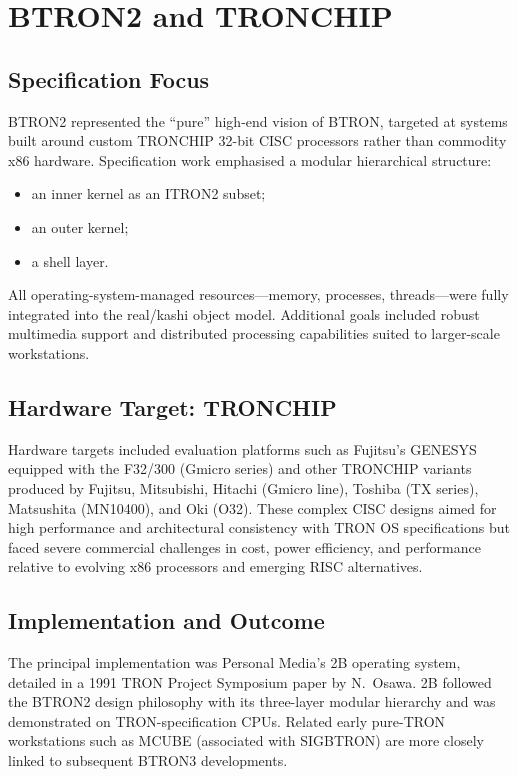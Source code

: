 \documentclass{article}
\begin{document}
\newpage
\section{BTRON2 and TRONCHIP}

\subsection{Specification Focus}

BTRON2 represented the ``pure'' high-end vision of BTRON, targeted at systems built around custom TRONCHIP 32-bit CISC processors rather than commodity x86 hardware. Specification work emphasised a modular hierarchical structure:

\begin{itemize}
  \item an inner kernel as an ITRON2 subset;
  \item an outer kernel;
  \item a shell layer.
\end{itemize}

All operating-system-managed resources---memory, processes, threads---were fully integrated into the real/kashi object model. Additional goals included robust multimedia support and distributed processing capabilities suited to larger-scale workstations.

\subsection{Hardware Target: TRONCHIP}

Hardware targets included evaluation platforms such as Fujitsu's GENESYS equipped with the F32/300 (Gmicro series) and other TRONCHIP variants produced by Fujitsu, Mitsubishi, Hitachi (Gmicro line), Toshiba (TX series), Matsushita (MN10400), and Oki (O32). These complex CISC designs aimed for high performance and architectural consistency with TRON OS specifications but faced severe commercial challenges in cost, power efficiency, and performance relative to evolving x86 processors and emerging RISC alternatives.

\subsection{Implementation and Outcome}

The principal implementation was Personal Media's 2B operating system, detailed in a 1991 TRON Project Symposium paper by N.~Osawa. 2B followed the BTRON2 design philosophy with its three-layer modular hierarchy and was demonstrated on TRON-specification CPUs. Related early pure-TRON workstations such as MCUBE (associated with SIGBTRON) are more closely linked to subsequent BTRON3 developments.
\end{document}
